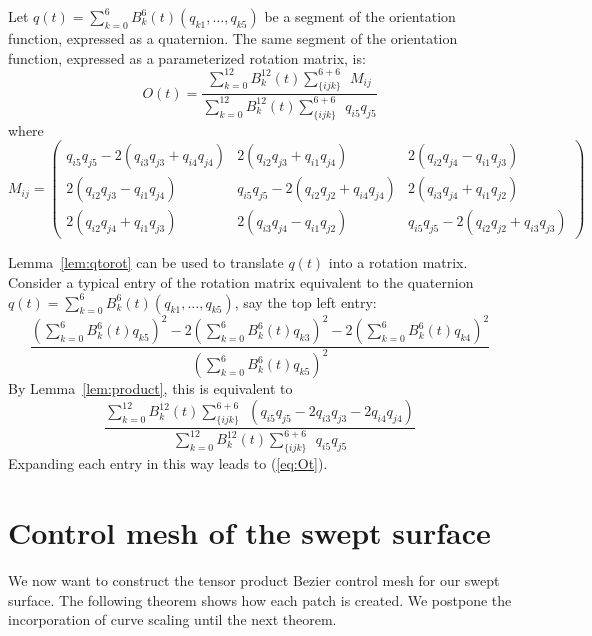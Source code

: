\begin{lemma}
\label{lem:Mij}
Let $q(t) = \sum_{k=0}^6 B_k^6(t) (q_{k1},\ldots,q_{k5})$
be a segment of the orientation function, expressed as a quaternion.
The same segment of the orientation function, expressed as a parameterized
rotation matrix, is:
\begin{equation}
\label{eq:Ot}
O(t) = \frac{\sum_{k=0}^{12} B_k^{12}(t) \sum_{\{ijk\}}^{6+6}\ \ M_{ij}}
	    {\sum_{k=0}^{12} B_k^{12}(t) \sum_{\{ijk\}}^{6+6} \ \ q_{i5}q_{j5}}
\end{equation}
where
\begin{equation}
	M_{ij} = \left( \begin{array}{ccc}
	q_{i5}q_{j5} - 2(q_{i3}q_{j3} + q_{i4}q_{j4}) &
	2(q_{i2}q_{j3} + q_{i1}q_{j4}) &
	2(q_{i2}q_{j4} - q_{i1}q_{j3}) \\
	2(q_{i2}q_{j3} - q_{i1}q_{j4}) &
	q_{i5}q_{j5} - 2(q_{i2}q_{j2} + q_{i4}q_{j4}) &
	2(q_{i3}q_{j4} + q_{i1}q_{j2}) \\
	2(q_{i2}q_{j4} + q_{i1}q_{j3}) &
	2(q_{i3}q_{j4} - q_{i1}q_{j2}) &
	q_{i5}q_{j5} - 2(q_{i2}q_{j2} + q_{i3}q_{j3}) 
	\end{array} \right)
\end{equation}
\end{lemma}
\prf
Lemma~\ref{lem:qtorot} can be used to translate $q(t)$ 
into a rotation matrix.
Consider a typical entry of the rotation matrix equivalent 
to the quaternion $q(t) = \sum_{k=0}^6 B_k^6(t) (q_{k1},\ldots,q_{k5})$,
say the top left entry:
\[
\frac{	(\sum_{k=0}^6 B_k^6(t) q_{k5})^2 - 
	2(\sum_{k=0}^6 B_k^6(t) q_{k3})^2 - 2(\sum_{k=0}^6 B_k^6(t) q_{k4})^2}
     {  (\sum_{k=0}^6 B_k^6(t) q_{k5})^2 }
\]
By Lemma~\ref{lem:product}, this is equivalent to
\[
\frac{	\sum_{k=0}^{12} B_k^{12}(t) \sum_{\{ijk\}}^{6+6}
	\ \ (q_{i5} q_{j5} - 2q_{i3}q_{j3} - 2q_{i4}q_{j4}) }
     {  \sum_{k=0}^{12} B_k^{12}(t) \sum_{\{ijk\}}^{6+6} \ \ q_{i5} q_{j5}} 
\]
Expanding each entry in this way leads to (\ref{eq:Ot}).
\QED

\section{Control mesh of the swept surface}

We now want to construct the tensor product Bezier control mesh 
for our swept surface.
The following theorem shows how each patch is created.
We postpone the incorporation of curve scaling until the next theorem.

